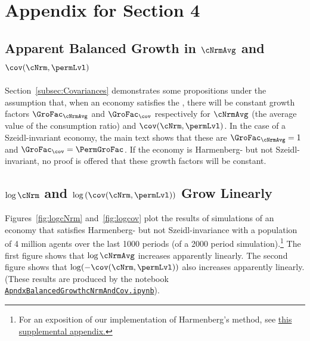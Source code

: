 \documentclass[\econtexRoot/BufferStockTheory]{subfiles}
\begin{document}
\hypertarget{ApndxBalancedGrowthcNrmAndCov}{}

\section{Appendix for Section 4}

\subsection{Apparent Balanced Growth in \texorpdfstring{$\cNrmAvg$}{c} and \texorpdfstring{$\cov(\cNrm,\permLvl)$}{cov(c,p)}}\label{sec:ApndxBalancedGrowthcNrmAndCov}

Section~\ref{subsec:Covariances} demonstrates some propositions under the assumption that, when an economy satisfies the {\GICRaw}, there will be constant growth factors $\GroFac_{\cNrmAvg}$ and $\GroFac_{\cov}$ respectively for $\cNrmAvg$ (the average value of the consumption ratio) and $\cov(\cNrm,\permLvl)$.  In the case of a Szeidl-invariant economy, the main text shows that these are $\GroFac_{\cNrmAvg}=1$ and $\GroFac_{\cov}=\PermGroFac$.  If the economy is Harmenberg- but not Szeidl-invariant, no proof is offered that these growth factors will be constant.

\subsection{\texorpdfstring{$\log \cNrm$}{log c} and \texorpdfstring{$\log \left(\cov(\cNrm,\permLvl)\right)$}{log cov(c,p)} Grow Linearly}
Figures~\ref{fig:logcNrm} and~\ref{fig:logcov} plot the results of simulations of an economy that satisfies Harmenberg- but not Szeidl-invariance with a population of 4 million agents over the last 1000 periods (of a 2000 period simulation).\footnote{For an exposition of our implementation of Harmenberg's method, see \href{https://github.com/econ-ark/BufferStockTheory/blob/master/Appendices/ApndxHarKmenberg.pdf}{this supplemental appendix.}}  The first figure shows that $\log \cNrmAvg$ increases apparently linearly.  The second figure shows that $\log (-\cov(\cNrm,\permLvl))$ also increases apparently linearly.  (These results are produced by the notebook \href{https://github.com/econ-ark/BufferStockTheory/blob/master/Code/Python/ApndxBalancedGrowthcNrmAndCov.ipynb}{\texttt{ApndxBalancedGrowthcNrmAndCov.ipynb}}).
\end{document}
